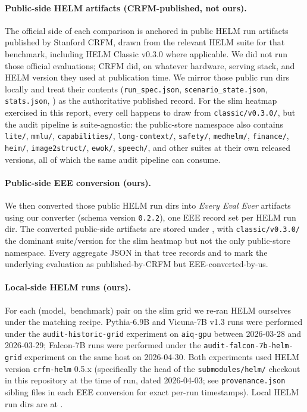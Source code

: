 \documentclass[11pt]{article}
\newcommand{\eee}{\textit{Every Eval Ever}\xspace}
\begin{document}
\paragraph{Public-side HELM artifacts (CRFM-published, not ours).}
The official side of each comparison is anchored in public HELM run
  artifacts published by Stanford CRFM, drawn from the relevant
  HELM suite for that benchmark, including HELM Classic v0.3.0 where
  applicable.
We did not run those official evaluations; CRFM did, on whatever
  hardware, serving stack, and HELM version they used at publication
  time.
We mirror those public run dirs locally and treat their contents
  (\texttt{run\_spec.json}, \texttt{scenario\_state.json},
  \texttt{stats.json}, ) as the
  authoritative published record.
For the slim heatmap exercised in this report, every cell happens to
  draw from \texttt{classic/v0.3.0/}, but the audit pipeline is
  suite-agnostic: the public-store namespace also contains
  \texttt{lite/}, \texttt{mmlu/}, \texttt{capabilities/},
  \texttt{long-context/}, \texttt{safety/}, \texttt{medhelm/},
  \texttt{finance/}, \texttt{heim/}, \texttt{image2struct/},
  \texttt{ewok/}, \texttt{speech/}, and other suites at their own
  released versions, all of which the same audit pipeline can
  consume.

\paragraph{Public-side EEE conversion (ours).}
We then converted those public HELM run dirs into \eee{} artifacts
  using our  converter
  (schema version \texttt{0.2.2}), one EEE record set per
  HELM run dir.
The converted public-side artifacts are stored under
  ,
  with \texttt{classic/v0.3.0/} the dominant suite/version for the
  slim heatmap but not the only public-store namespace.
Every aggregate JSON in that tree records
  and  to
  mark the underlying evaluation as published-by-CRFM but
  EEE-converted-by-us.

\paragraph{Local-side HELM runs (ours).}
For each \mbox{(model, benchmark)} pair on the slim grid we re-ran
  HELM ourselves under the matching recipe.
Pythia-6.9B and Vicuna-7B v1.3 runs were performed under the
  \texttt{audit-historic-grid} experiment on
  \texttt{aiq-gpu} between 2026-03-28 and 2026-03-29;
  Falcon-7B runs were performed under the
  \texttt{audit-falcon-7b-helm-grid} experiment on the same host
  on 2026-04-30.
Both experiments used HELM version \texttt{crfm-helm} 0.5.x
  (specifically the head of the \texttt{submodules/helm/} checkout
  in this repository at the time of run, dated 2026-04-03; see
  \texttt{provenance.json} sibling files in each EEE conversion
  for exact per-run timestamps).
Local HELM run dirs are at
  .
\end{document}

